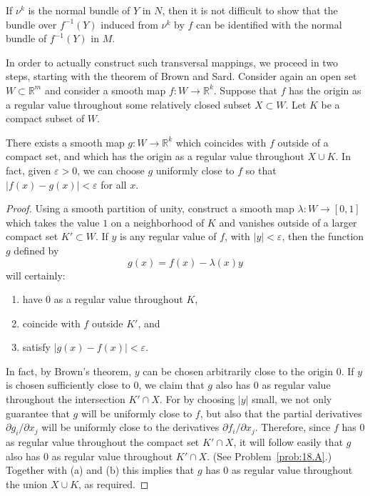 \documentclass[../main]{subfiles}
\begin{document}

If $\nu^k$ is the normal bundle of $Y$ in $N$, then it is not difficult to show that the bundle over $f^{-1}(Y)$ induced from $\nu^k$ by $f$ can be identified with the normal bundle of $f^{-1}(Y)$ in $M$.  

In order to actually construct such transversal mappings, we proceed in two steps, starting with the theorem of Brown and Sard. Consider again an open set $W \subset {\mathbb R}^m$ and consider a smooth map $f : W \longrightarrow {\mathbb R}^k$. Suppose that $f$ has the origin as a regular value throughout some relatively closed subset $X \subset W$. Let $K$ be a compact subset of $W$.

\begin{lemma}\label{lem:18.5}
There exists a smooth map $g : W \longrightarrow {\mathbb R}^k$ which coincides with $f$ outside of a compact set, and which has the origin as a regular value throughout $X \cup K$. In fact, given $\varepsilon > 0$, we can choose $g$ uniformly close to $f$ so that $|f(x) - g(x)| < \varepsilon$ for all $x$. 
\end{lemma}

\begin{proof}
Using a smooth partition of unity, construct a smooth map $\lambda : W \longrightarrow [0, 1]$ which takes the value $1$ on a neighborhood of $K$ and vanishes outside of a larger compact set $K' \subset W$. If $y$ is any regular value of $f$, with $|y| < \varepsilon$, then the function $g$ defined by \[g(x) = f(x) - \lambda(x) y\] will certainly:

\begin{enumerate}[label=(\alph*)]
    \item have $0$ as a regular value throughout $K$,
    \item coincide with $f$ outside $K'$, and
    \item satisfy $|g(x) - f(x)| < \varepsilon$.
\end{enumerate}

In fact, by Brown's theorem, $y$ can be chosen arbitrarily close to the origin $0$. If $y$ is chosen sufficiently close to $0$, we claim that $g$ also has $0$ as regular value throughout the intersection $K' \cap X$. For by choosing $|y|$ small, we not only guarantee that $g$ will be uniformly close to $f$, but also that the partial derivatives $\partial g_i/\partial x_j$ will be uniformly close to the derivatives $\partial f_i/\partial x_j$. Therefore, since $f$ has $0$ as regular value throughout the compact set $K' \cap X$, it will follow easily that $g$ also has $0$ as regular value throughout $K' \cap X$. (See Problem~\ref{prob:18.A}.) Together with (a) and (b) this implies that $g$ has $0$ as regular value throughout the union $X \cup K$, as required.
\end{proof}
\end{document}

